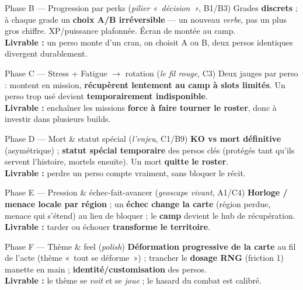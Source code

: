 \documentclass[11pt,a4paper]{article}
\begin{document}
\begin{phase}{Phase B --- Progression par perks \textnormal{(\emph{pilier «~décision~»}, B1/B3)}}
Grades \textbf{discrets} ; à chaque grade un \textbf{choix A/B irréversible} --- un nouveau \emph{verbe}, pas un plus gros chiffre. XP/puissance plafonnée. Écran de montée au camp.\\
\textbf{Livrable :} un perso monte d'un cran, on choisit A ou B, deux persos identiques divergent durablement.
\end{phase}

\begin{phase}{Phase C --- Stress + Fatigue $\to$ rotation \textnormal{(\emph{le fil rouge}, C3)}}
Deux jauges par perso : montent en mission, \textbf{récupèrent lentement au camp à slots limités}. Un perso trop usé devient \textbf{temporairement indisponible}.\\
\textbf{Livrable :} enchaîner les missions \textbf{force à faire tourner le roster}, donc à investir dans plusieurs builds.
\end{phase}

\begin{phase}{Phase D --- Mort \& statut spécial \textnormal{(\emph{l'enjeu}, C1/B9)}}
\textbf{KO vs mort définitive} (asymétrique) ; \textbf{statut spécial temporaire} des persos clés (protégés tant qu'ils servent l'histoire, mortels ensuite). Un mort \textbf{quitte le roster}.\\
\textbf{Livrable :} perdre un perso compte vraiment, sans bloquer le récit.
\end{phase}

\begin{phase}{Phase E --- Pression \& échec-fait-avancer \textnormal{(\emph{geoscape vivant}, A1/C4)}}
\textbf{Horloge / menace locale par région} ; un \textbf{échec change la carte} (région perdue, menace qui s'étend) au lieu de bloquer ; le \textbf{camp} devient le hub de récupération.\\
\textbf{Livrable :} tarder ou échouer \textbf{transforme le territoire}.
\end{phase}

\begin{phase}{Phase F --- Thème \& feel \textnormal{(\emph{polish})}}
\textbf{Déformation progressive de la carte} au fil de l'acte (thème «~tout se déforme~») ; trancher le \textbf{dosage RNG} (friction 1) manette en main ; \textbf{identité/customisation} des persos.\\
\textbf{Livrable :} le thème se \emph{voit} et se \emph{joue} ; le hasard du combat est calibré.
\end{phase}
\end{document}
